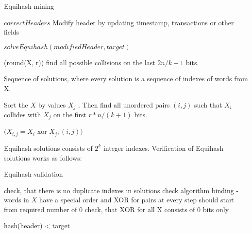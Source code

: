 \begin{algorithm}[H]
    \caption{Equihash mining}
    \label{alg:eq:mining}
    \begin{algorithmic}[1]

                \Return $correctHeaders$
            \Else
                \State Modify header by updating timestamp, transactions or other fields

                \Return $solveEquihash(modifiedHeader, target)$
            \EndIf
        \EndFunction

              (round(X, r))
            \EndFor
            \State find all possible collisions on the last $2n/k+1$ bits.

            \Return Sequence of solutions, where every solution is a sequence of indexes of words from X.
        \EndFunction

        \State Sort the $X$ by values $X_j$ .
        \State Then find all unordered pairs $(i, j)$ such that $X_i$ collides with $X_j$ on the first $r * n/(k+1)$ bits.

        \Return $(X_{i,j} = X_i$ xor $X_j, (i , j))$
        \EndFunction

    \end{algorithmic}
\end{algorithm}

Equihash solutions consists of $2^k$ integer indexes.
Verification of Equihash solutions works as follows:
\begin{algorithm}[H]
    \caption{Equihash validation}
    \label{alg:eq:valudation}
    \begin{algorithmic}[1]
        \State check, that there is no duplicate indexes in solutions
        \State check algorithm binding - words in $X$ have a special order and XOR for pairs at every step should start from required number of 0
        \State check, that XOR for all X consists of 0 bits only

        \Return hash(header) < target
        \EndFunction
    \end{algorithmic}
\end{algorithm}

